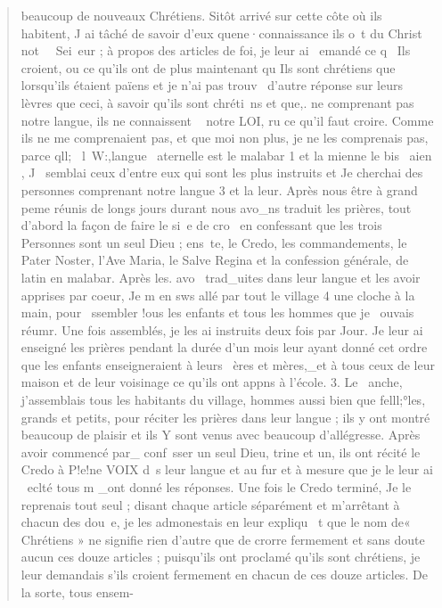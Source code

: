 \begin{quote}

beaucoup de nouveaux Chrétiens. Sitôt arrivé sur cette côte
où ils habitent, J ai tâché de savoir d'eux quene·connaissance ils
o~t du Christ not~~ Sei~eur ; à propos des articles de foi, je leur
ai ~emandé ce q~ Ils croient, ou ce qu'ils ont de plus maintenant
qu Ils sont chrétiens que lorsqu'ils étaient païens et je n'ai pas
trouv~ d'autre réponse sur leurs lèvres que ceci, à savoir qu'ils sont
chréti~ns et que,. ne comprenant pas notre langue, ils ne connaissent
~ notre LOI, ru ce qu'il faut croire. Comme ils ne me comprenaient
pas, et que moi non plus, je ne les comprenais pas, parce
qll;~ l~W:,langue ~aternelle est le malabar 1 et la mienne le bis~
aien , J ~semblai ceux d'entre eux qui sont les plus instruits et
Je cherchai des personnes comprenant notre langue 3 et la leur.
Après nous être à grand peme réunis de longs jours durant nous
avo_ns traduit les prières, tout d'abord la façon de faire le si~e de
cro~ en confessant que les trois Personnes sont un seul Dieu ;
ens~te, le Credo, les commandements, le Pater Noster, l'Ave
Maria, le Salve Regina et la confession générale, de latin en malabar.
Après les. avo~ trad_uites dans leur langue et les avoir apprises
par coeur, Je m en sws allé par tout le village 4 une cloche à la
main, pour ~ssembler !ous les enfants et tous les hommes que je
~ouvais réumr. Une fois assemblés, je les ai instruits deux fois par
Jour. Je leur ai enseigné les prières pendant la durée d'un mois leur
ayant donné cet ordre que les enfants enseigneraient à leurs ~ères
et mères,_et à tous ceux de leur maison et de leur voisinage ce qu'ils
ont appns à l'école.
3. Le ~anche, j'assemblais tous les habitants du village, hommes
aussi bien que felll;°les, grands et petits, pour réciter les prières
dans leur langue ; ils y ont montré beaucoup de plaisir et ils
Y sont venus avec beaucoup d'allégresse. Après avoir commencé
par_ conf~sser un seul Dieu, trine et un, ils ont récité le Credo à
P!e!ne VOIX d~s leur langue et au fur et à mesure que je le leur ai
~eclté tous m _ont donné les réponses. Une fois le Credo terminé,
Je le reprenais tout seul ; disant chaque article séparément et
m'arrêtant à chacun des dou~e, je les admonestais en leur expliqu~
t que le nom de« Chrétiens » ne signifie rien d'autre que de
crorre fermement et sans doute aucun ces douze articles ; puisqu'ils
ont proclamé qu'ils sont chrétiens, je leur demandais s'ils croient
fermement en chacun de ces douze articles. De la sorte, tous ensem-
\end{quote}